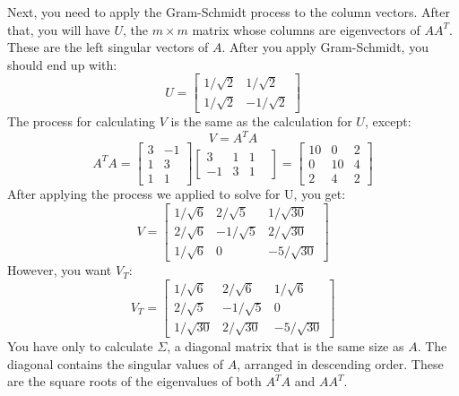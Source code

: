 Next, you need to apply the Gram-Schmidt process to the column vectors. After that, you will have $U$, the $m \times m$ matrix whose columns are eigenvectors of $AA^T$. These are the left singular vectors of $A$. After you apply Gram-Schmidt, you should end up with:
$$
U = \begin{bmatrix}
1/\sqrt{2} & 1/\sqrt{2} \\
1/\sqrt{2} & -1/\sqrt{2} 
\end{bmatrix}
$$
The process for calculating $V$ is the same as the calculation for $U$, except:
$$V = A^TA$$ 
$$A^TA = 
\begin{bmatrix}
3 & -1\\
1 & 3\\
1 & 1
\end{bmatrix}
\begin{bmatrix}
3 & 1 & 1\\
-1 & 3 & 1&
\end{bmatrix}
=
\begin{bmatrix}
10 & 0 & 2 \\
0 & 10 & 4 \\
2 & 4 & 2
\end{bmatrix}
$$
After applying the process we applied to solve for U, you get:
$$
V = \begin{bmatrix}
1/\sqrt{6} & 2/\sqrt{5} & 1/\sqrt{30} \\
2/\sqrt{6} & -1/\sqrt{5} & 2/\sqrt{30}\\
1/\sqrt{6} & 0 & -5/\sqrt{30}
\end{bmatrix}
$$
However, you want $V_T$:
$$
V_T =
\begin{bmatrix}
1/\sqrt{6} & 2/\sqrt{6} & 1/\sqrt{6} \\
2/\sqrt{5} & -1/\sqrt{5} & 0\\
1/\sqrt{30} & 2/\sqrt{30} & -5/\sqrt{30}
\end{bmatrix}
$$
You have only to calculate $\Sigma$, a diagonal matrix that is the same size as $A$. The diagonal contains the singular values of $A$, arranged in descending order. These are the square roots of the eigenvalues of both $A^TA$ and $AA^T$.

